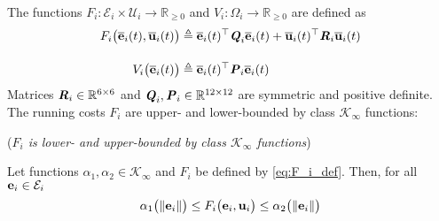 


The functions
$F_i : \mathcal{E}_i \times \mathcal{U}_i \to \mathbb{R}_{\geq 0}$ and
$V_i: \Omega_i \to \mathbb{R}_{\geq 0}$ are defined as
\begin{align}
  F_i \big(\overline{\bm{\mathbf{e}}}_i(t), \overline{\bm{\mathbf{u}}}_i(t)\big)
    &\triangleq \overline{\bm{\mathbf{e}}}_i(t)^{\top} \bm{\mathit{Q}}_i \overline{\bm{\mathbf{e}}}_i(t)
  + \overline{\bm{\mathbf{u}}}_i(t)^{\top} \bm{\mathit{R}}_i \overline{\bm{\mathbf{u}}}_i(t) \label{eq:F_i_def} \\[2.5ex]
  V_i \big(\overline{\bm{\mathbf{e}}}_i(t)\big) & \triangleq \overline{\bm{\mathbf{e}}}_i(t)^{\top} \bm{\mathit{P}}_i \overline{\bm{\mathbf{e}}}_i(t) \label{eq:V_i_def}
\end{align}
Matrices $\bm{\mathit{R}}_i \in \mathbb{R}^{6 \times 6}$ and
$\bm{\mathit{Q}}_i, \bm{\mathit{P}}_i \in \mathbb{R}^{12 \times 12}$ are symmetric and positive
definite.  The running costs $F_i$ are upper- and lower-bounded by class
$\mathcal{K}_{\infty}$ functions:

\begin{bw_box}
  \begin{lemma} (\textit{$F_i$ is lower- and upper-bounded by class $\mathcal{K}_{\infty}$ functions})
    \label{lemma:F_i_bounded_K_class}

    Let functions $\alpha_1, \alpha_2 \in \mathcal{K}_{\infty}$ and $F_i$
    be defined by \eqref{eq:F_i_def}. Then, for all
    $\bm{\mathbf{e}}_i \in \mathcal{E}_i$
    \begin{align}
      \alpha_1\big(\|\bm{\mathbf{e}}_i\|\big) \leq F_i\big(\bm{\mathbf{e}}_i, \bm{\mathbf{u}}_i\big) \leq \alpha_2\big(\| \bm{\mathbf{e}}_i \|\big)
    \end{align}
  \end{lemma}
\end{bw_box}

